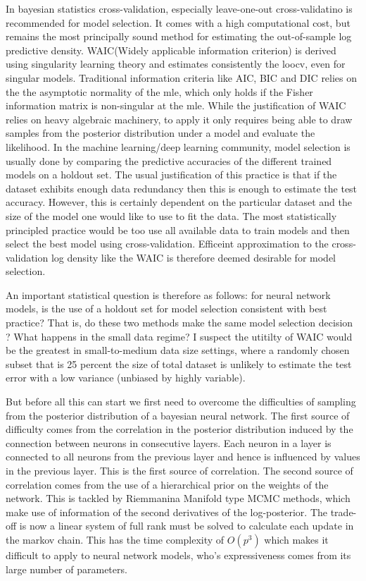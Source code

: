 \documentclass{book}
\begin{document}
\begin{enumerate}
In bayesian statistics \cite{gelman2014bayesian} cross-validation, especially leave-one-out cross-validatino is recommended for model selection. It comes with a high computational cost, but remains the most principally sound method for estimating the out-of-sample log predictive density. WAIC(Widely applicable information criterion) is derived using singularity learning theory and estimates consistently the loocv, even for singular models. Traditional information criteria like AIC, BIC and DIC relies on the the asymptotic normality of the mle, which only holds if the Fisher information matrix is non-singular at the mle. While the justification of WAIC relies on heavy algebraic machinery, to apply it only requires being able to draw samples from the posterior distribution under a model and evaluate the likelihood.  
In the machine learning/deep learning community, model selection is usually done
by comparing the predictive accuracies of the different trained models on a
holdout set. The usual justification of this practice is that if the dataset
exhibits enough data redundancy then  this is enough to estimate the test
accuracy. However, this is certainly dependent on the particular dataset and the
size of the model one would like to use to fit the data. The most statistically
principled practice would be too use all available data to train models and then
select the best model using cross-validation. Efficeint approximation to the
cross-validation log density like the WAIC is therefore deemed desirable for
model selection. 

An important statistical question is therefore as follows: for neural network models, is
the use of a holdout set for model selection consistent with best practice?
That is, do these two methods make the same model selection decision ? What happens
in the small data regime? I suspect the utitilty of WAIC would be the greatest
in small-to-medium data size settings, where a randomly chosen subset that is 25
percent the size of total dataset is unlikely to estimate the test error with a
low variance (unbiased by highly variable).

But before all this can start we first need to overcome the difficulties of
sampling from the posterior distribution of a bayesian neural network. The
first source of difficulty comes from the correlation in the posterior distribution induced by
the connection between neurons in consecutive layers. Each neuron in a layer is
connected to all neurons from the previous layer and hence is influenced by
values in the previous layer. This is the first source of correlation. The
second source of correlation comes from the use of a hierarchical prior on the
weights of the network. This is tackled by Riemmanina Manifold type MCMC
methods, which make use of information of the second derivatives of the
log-posterior. The trade-off is now a linear system of full rank must be solved
to calculate each update in the markov chain. This has the time complexity of
$O(p^3)$ which makes it difficult to apply to neural network models, who's
expressiveness comes from its large number of parameters. 


\end{enumerate}
\end{document}
